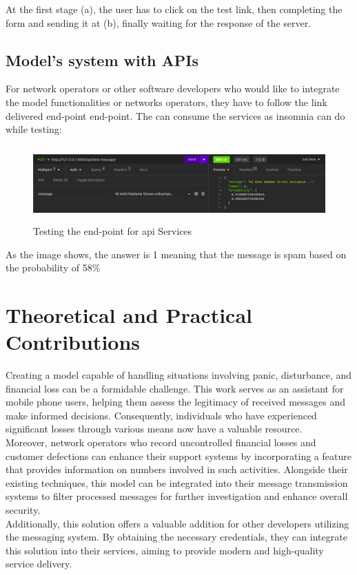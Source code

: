 \documentclass[12pt,a4paper, oneside]{book}
\begin{document}
At the first stage (a), the user has to click on the test link, then completing the form and sending it  at (b), finally waiting for the response of the server.

\subsection{Model's system with APIs}
For network operators or other software developers  who would like to integrate the model functionalities or networks operators,  they have to follow the link delivered end-point end-point. The can consume the services as insomnia can do while testing:
\begin{figure}[h]
	\centering
	\includegraphics[width=15.8cm, height=2.9cm]{CollectImages/insomniaTest}
	\caption{Testing the end-point for api Services}
	\label{fig:insomniatest}
\end{figure} 
As the image shows, the answer is 1 meaning that the message is spam based on the probability of 58\%

\section{Theoretical and Practical Contributions}
Creating a model capable of handling situations involving panic, disturbance, and financial loss can be a formidable challenge. This work serves as an assistant for mobile phone users, helping them assess the legitimacy of received messages and make informed decisions. Consequently, individuals who have experienced significant losses through various means now have a valuable resource.\\

Moreover, network operators who record uncontrolled financial losses and customer defections can enhance their support systems by incorporating a feature that provides information on numbers involved in such activities. Alongside their existing techniques, this model can be integrated into their message transmission systems to filter processed messages for further investigation and enhance overall security.\\

Additionally, this solution offers a valuable addition for other developers utilizing the messaging system. By obtaining the necessary credentials, they can integrate this solution into their services, aiming to provide modern and high-quality service delivery.
\end{document}
